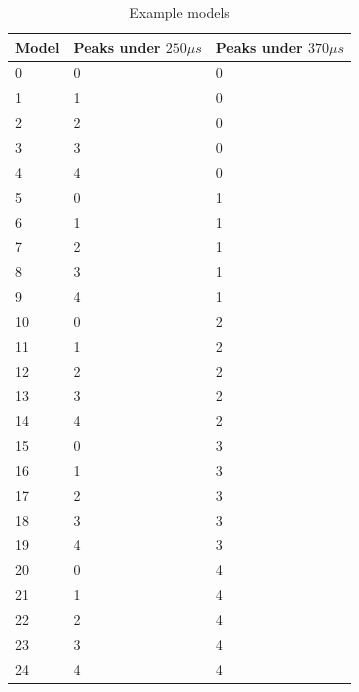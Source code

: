\documentclass[a4paper]{article}
\begin{document}
\begin{table}[h1]
  \centering
  \begin{tabular}{@{}lll@{}}
    \toprule
    Model & Peaks under $250 \mu s$ & Peaks under $370 \mu s$ \\
    \midrule
    0     & 0                       & 0                       \\
    1     & 1                       & 0                       \\
    2     & 2                       & 0                       \\
    3     & 3                       & 0                       \\
    4     & 4                       & 0                       \\
    5     & 0                       & 1                       \\
    6     & 1                       & 1                       \\
    7     & 2                       & 1                       \\
    8     & 3                       & 1                       \\
    9     & 4                       & 1                       \\
    10    & 0                       & 2                       \\
    11    & 1                       & 2                       \\
    12    & 2                       & 2                       \\
    13    & 3                       & 2                       \\
    14    & 4                       & 2                       \\
    15    & 0                       & 3                       \\
    16    & 1                       & 3                       \\
    17    & 2                       & 3                       \\
    18    & 3                       & 3                       \\
    19    & 4                       & 3                       \\
    20    & 0                       & 4                       \\
    21    & 1                       & 4                       \\
    22    & 2                       & 4                       \\
    23    & 3                       & 4                       \\
    24    & 4                       & 4                       \\
    \bottomrule
  \end{tabular}
  \caption{Example models}
  \label{tab:ba_example_models}
\end{table}
\FloatBarrier
\end{document}
